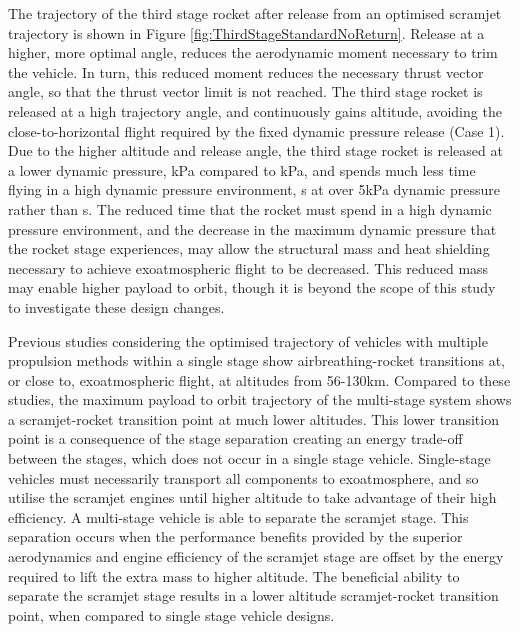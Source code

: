The trajectory of the third stage rocket after release from an optimised scramjet trajectory is shown in Figure \ref{fig:ThirdStageStandardNoReturn}. Release at a higher, more optimal angle, reduces the aerodynamic moment necessary to trim the vehicle. In turn, this reduced moment reduces the necessary thrust vector angle, so that the thrust vector limit is not reached. The third stage rocket is released at a high trajectory angle, and continuously gains altitude, avoiding the close-to-horizontal flight required by the fixed dynamic pressure release (Case 1).
Due to the higher altitude and release angle, the third stage rocket is released at a lower dynamic pressure, \secondthirdSeparationqCdStandardNoReturn kPa compared to \secondthirdSeparationqConstqNoReturn kPa, and spends much less time flying in a high dynamic pressure environment, \thirdqOverFiveStandard s at over 5kPa dynamic pressure rather than \thirdqOverFiveConstqNoReturn s. 
The reduced time that the rocket must spend in a high dynamic pressure environment, and the decrease in the maximum dynamic pressure that the rocket stage experiences, may allow the structural mass and heat shielding necessary to achieve exoatmospheric flight to be decreased. This reduced mass may enable higher payload to orbit, though it is beyond the scope of this study to investigate these design changes. 


Previous studies considering the optimised trajectory of vehicles with multiple propulsion methods within a single stage show airbreathing-rocket transitions at, or close to, exoatmospheric flight, at altitudes from 56-130km\cite{Lu1993,Trefny1999,Bradford2000}. Compared to these studies, the maximum payload to orbit trajectory of the multi-stage system shows a scramjet-rocket transition point at much lower altitudes.
This lower transition point is a consequence of the stage separation creating an energy trade-off between the stages, which does not occur in a single stage vehicle. Single-stage vehicles must necessarily transport all components to exoatmosphere, and so utilise the scramjet engines until higher altitude to take advantage of their high efficiency. A multi-stage vehicle is able to separate the scramjet stage. 
This separation occurs when the performance benefits provided by the superior aerodynamics and engine efficiency of the scramjet stage are offset by the energy required to lift the extra mass to higher altitude. The beneficial ability
to separate the scramjet stage results in a lower altitude scramjet-rocket transition point, when compared to single
stage vehicle designs.


